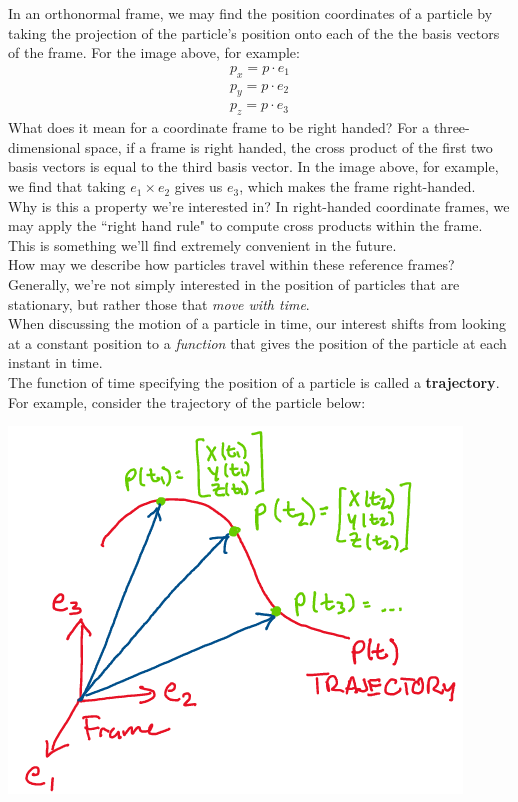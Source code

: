 \documentclass[oneside]{book}
\begin{document}
In an orthonormal frame, we may find the position coordinates of a particle by taking the projection of the particle's position onto each of the the basis vectors of the frame. For the image above, for example:
\begin{align}
    p_x = p\cdot e_1\\
    p_y = p\cdot e_2\\
    p_z = p\cdot e_3
\end{align}
What does it mean for a coordinate frame to be right handed? For a three-dimensional space, if a frame is right handed, the cross product of the first two basis vectors is equal to the third basis vector.
In the image above, for example, we find that taking $e_1 \times e_2$ gives us $e_3$, which makes the frame right-handed.\\
Why is this a property we're interested in?
In right-handed coordinate frames, we may apply the ``right hand rule" to compute cross products within the frame. This is something we'll find extremely convenient in the future.\\
How may we describe how particles travel within these reference frames? Generally, we're not simply interested in the position of particles that are stationary, but rather those that \textit{move with time}.\\
When discussing the motion of a particle in time, our interest shifts from looking at a constant position to a \textit{function} that gives the position of the particle at each instant in time.\\
The function of time specifying the position of a particle is called a \textbf{trajectory}.
For example, consider the trajectory of the particle below:
\begin{center}
    \includegraphics[scale=0.5]{images/traj.png}\\
\end{center}
\end{document}
